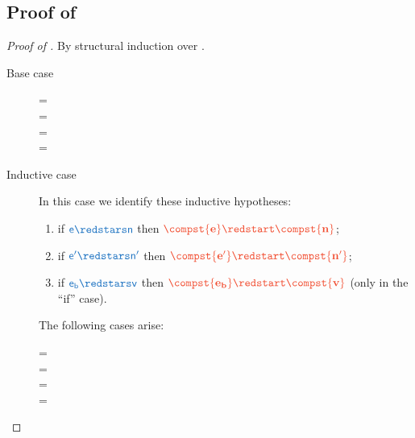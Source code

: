 \documentclass{article}
\theoremstyle{definition}
\begin{document}
\subsection{Proof of }\label{sec:proof-thm:fow-sim}
\begin{proof}[Proof of ]
	By structural induction over .
	\begin{description}
		\item[Base case]
		\begin{description}
			\item[=]  
			\item[=\src{\truev}]  
			\item[=\src{\falsev}]  
			\item[=] 
		\end{description}
		\item[Inductive case]

		In this case we identify these inductive hypotheses:
		\begin{enumerate}
			\item if $\src{e \redstars n}$ then $\trg{\compst{e}\redstart \compst{n}}$;
			\item if $\src{e' \redstars n'}$ then $\trg{\compst{e'}\redstart \compst{n'}}$;
			\item if $\src{e_b \redstars v}$ then $\trg{\compst{e_b}\redstart \compst{v}}$ (only in the ``if'' case).
		\end{enumerate}

		The following cases arise:
		\begin{description}
			\item[=] 
			\item[=]
			\item[=] 
			\item[=] 
		\end{description}
	\end{description}
\end{proof}
\end{document}
